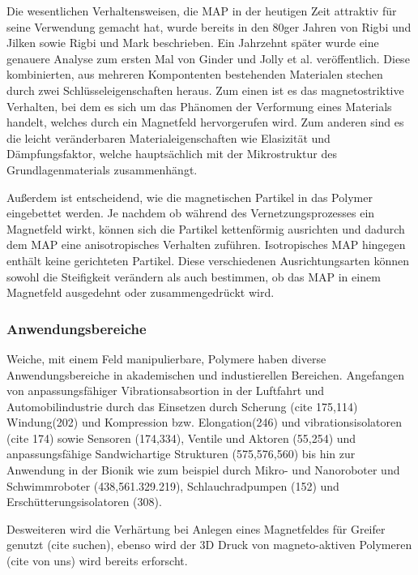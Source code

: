 Die wesentlichen Verhaltensweisen, die MAP in der heutigen Zeit attraktiv für seine Verwendung gemacht hat, wurde bereits in den 80ger Jahren von Rigbi und Jilken \cite{Rigbi1} sowie Rigbi und Mark \cite{Rigbi2} beschrieben. Ein Jahrzehnt später wurde eine genauere Analyse zum ersten Mal von Ginder und Jolly et al. \cite{ginder} veröffentlich. 
Diese kombinierten, aus mehreren Kompontenten bestehenden Materialen stechen durch zwei Schlüsseleigenschaften heraus. 
Zum einen ist es das magnetostriktive Verhalten, bei dem es sich um das Phänomen der Verformung eines Materials handelt, welches durch ein Magnetfeld hervorgerufen wird. \cite{gulley}
Zum anderen sind es die leicht veränderbaren Materialeigenschaften wie Elasizität und Dämpfungsfaktor, welche hauptsächlich mit der Mikrostruktur des Grundlagenmaterials zusammenhängt. \cite{Varga1} \cite{Varga2}

Außerdem ist entscheidend, wie die magnetischen Partikel in das Polymer eingebettet werden. Je nachdem ob während des Vernetzungsprozesses ein Magnetfeld wirkt, können sich die Partikel kettenförmig ausrichten und dadurch dem MAP eine anisotropisches Verhalten zuführen. Isotropisches MAP hingegen enthält keine gerichteten Partikel. Diese verschiedenen Ausrichtungsarten können sowohl die Steifigkeit verändern als auch bestimmen, ob das MAP in einem Magnetfeld ausgedehnt oder zusammengedrückt wird. 


\subsubsection{Anwendungsbereiche}
Weiche, mit einem Feld manipulierbare, Polymere haben diverse Anwendungsbereiche in akademischen und industierellen Bereichen. Angefangen von anpassungsfähiger Vibrationsabsortion in der Luftfahrt und Automobilindustrie durch das Einsetzen durch Scherung (cite 175,114) Windung(202) und Kompression bzw. Elongation(246) und vibrationsisolatoren (cite 174) sowie Sensoren (174,334), Ventile und Aktoren (55,254) und anpassungsfähige Sandwichartige Strukturen (575,576,560) bis hin zur Anwendung in der Bionik wie zum beispiel durch Mikro- und Nanoroboter und Schwimmroboter (438,561.329.219), Schlauchradpumpen (152) und Erschütterungsisolatoren (308).

Desweiteren wird die Verhärtung bei Anlegen eines Magnetfeldes für Greifer genutzt (cite suchen), ebenso wird der 3D Druck von magneto-aktiven Polymeren (cite von uns) wird bereits erforscht.

	
